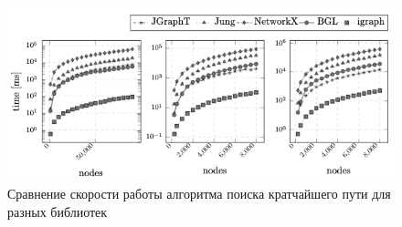 \begin{figure}[ht!]
    \center
    \includegraphics [scale=0.75] {my_folder/myimg//3}
    \caption{Сравнение скорости работы алгоритма поиска кратчайшего пути для разных библиотек}
\end{figure}


